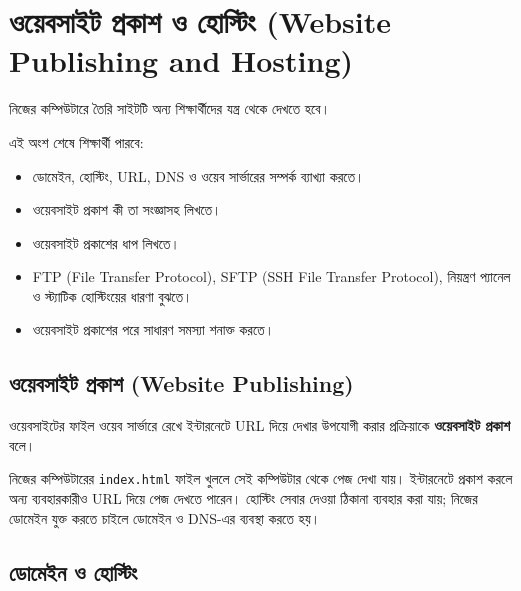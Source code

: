 \section{ওয়েবসাইট প্রকাশ ও হোস্টিং (Website Publishing and Hosting)}

নিজের কম্পিউটারে তৈরি সাইটটি অন্য শিক্ষার্থীদের যন্ত্র থেকে দেখতে হবে।



\begin{learningbox}
এই অংশ শেষে শিক্ষার্থী পারবে:
\begin{itemize}
\item ডোমেইন, হোস্টিং, URL, DNS ও ওয়েব সার্ভারের সম্পর্ক ব্যাখ্যা করতে।
\item ওয়েবসাইট প্রকাশ কী তা সংজ্ঞাসহ লিখতে।
\item ওয়েবসাইট প্রকাশের ধাপ লিখতে।
\item FTP (File Transfer Protocol), SFTP (SSH File Transfer Protocol), নিয়ন্ত্রণ প্যানেল ও স্ট্যাটিক হোস্টিংয়ের ধারণা বুঝতে।
\item ওয়েবসাইট প্রকাশের পরে সাধারণ সমস্যা শনাক্ত করতে।
\end{itemize}
\end{learningbox}

\subsection{ওয়েবসাইট প্রকাশ (Website Publishing)}

\begin{definitionbox}{}
ওয়েবসাইটের ফাইল ওয়েব সার্ভারে রেখে ইন্টারনেটে URL দিয়ে দেখার উপযোগী করার প্রক্রিয়াকে \textbf{ওয়েবসাইট প্রকাশ} বলে।
\end{definitionbox}

নিজের কম্পিউটারের \texttt{index.html} ফাইল খুললে সেই কম্পিউটার থেকে পেজ দেখা যায়। ইন্টারনেটে প্রকাশ করলে অন্য ব্যবহারকারীও URL দিয়ে পেজ দেখতে পারেন। হোস্টিং সেবার দেওয়া ঠিকানা ব্যবহার করা যায়; নিজের ডোমেইন যুক্ত করতে চাইলে ডোমেইন ও DNS-এর ব্যবস্থা করতে হয়।

\subsection{ডোমেইন ও হোস্টিং}

